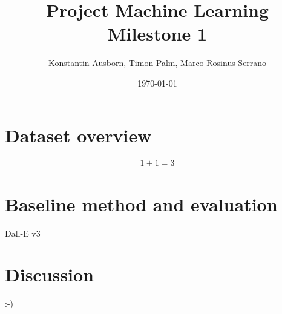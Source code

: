 \documentclass[10pt,a4paper,twoside]{article}
\title{Project Machine Learning\\--- Milestone 1 ---}
\author{Konstantin Ausborn, Timon Palm, Marco Rosinus Serrano}
\date{\today}
\begin{document}
\maketitle

\section{Dataset overview}
    \begin{align}
        1 + 1 = 3
    \end{align}

\section{Baseline method and evaluation}
Dall-E v3

\section{Discussion}
:-)
\end{document}
